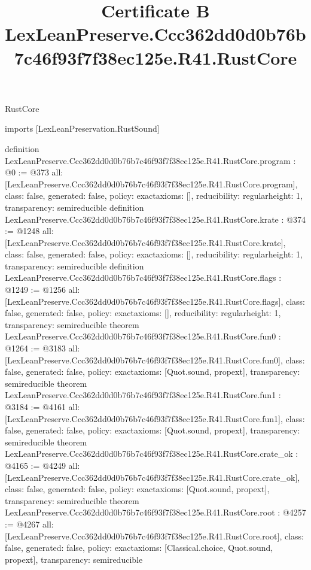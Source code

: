 \begin{lexlean}{RustCore}
\title{Certificate B LexLeanPreserve.Ccc362dd0d0b76b7c46f93f7f38ec125e.R41.RustCore}
\begin{coremodule}
imports [LexLeanPreservation.RustSound]

definition LexLeanPreserve.Ccc362dd0d0b76b7c46f93f7f38ec125e.R41.RustCore.program : @0 := @373 {
  all: [LexLeanPreserve.Ccc362dd0d0b76b7c46f93f7f38ec125e.R41.RustCore.program],
  class: false,
  generated: false,
  policy: exact{axioms: []},
  reducibility: regular{height: 1},
  transparency: semireducible
}
definition LexLeanPreserve.Ccc362dd0d0b76b7c46f93f7f38ec125e.R41.RustCore.krate : @374 := @1248 {
  all: [LexLeanPreserve.Ccc362dd0d0b76b7c46f93f7f38ec125e.R41.RustCore.krate],
  class: false,
  generated: false,
  policy: exact{axioms: []},
  reducibility: regular{height: 1},
  transparency: semireducible
}
definition LexLeanPreserve.Ccc362dd0d0b76b7c46f93f7f38ec125e.R41.RustCore.flags : @1249 := @1256 {
  all: [LexLeanPreserve.Ccc362dd0d0b76b7c46f93f7f38ec125e.R41.RustCore.flags],
  class: false,
  generated: false,
  policy: exact{axioms: []},
  reducibility: regular{height: 1},
  transparency: semireducible
}
theorem LexLeanPreserve.Ccc362dd0d0b76b7c46f93f7f38ec125e.R41.RustCore.fun0 : @1264 := @3183 {
  all: [LexLeanPreserve.Ccc362dd0d0b76b7c46f93f7f38ec125e.R41.RustCore.fun0],
  class: false,
  generated: false,
  policy: exact{axioms: [Quot.sound, propext]},
  transparency: semireducible
}
theorem LexLeanPreserve.Ccc362dd0d0b76b7c46f93f7f38ec125e.R41.RustCore.fun1 : @3184 := @4161 {
  all: [LexLeanPreserve.Ccc362dd0d0b76b7c46f93f7f38ec125e.R41.RustCore.fun1],
  class: false,
  generated: false,
  policy: exact{axioms: [Quot.sound, propext]},
  transparency: semireducible
}
theorem LexLeanPreserve.Ccc362dd0d0b76b7c46f93f7f38ec125e.R41.RustCore.crate_ok : @4165 := @4249 {
  all: [LexLeanPreserve.Ccc362dd0d0b76b7c46f93f7f38ec125e.R41.RustCore.crate_ok],
  class: false,
  generated: false,
  policy: exact{axioms: [Quot.sound, propext]},
  transparency: semireducible
}
theorem LexLeanPreserve.Ccc362dd0d0b76b7c46f93f7f38ec125e.R41.RustCore.root : @4257 := @4267 {
  all: [LexLeanPreserve.Ccc362dd0d0b76b7c46f93f7f38ec125e.R41.RustCore.root],
  class: false,
  generated: false,
  policy: exact{axioms: [Classical.choice, Quot.sound, propext]},
  transparency: semireducible
}


\end{coremodule}
\end{lexlean}
